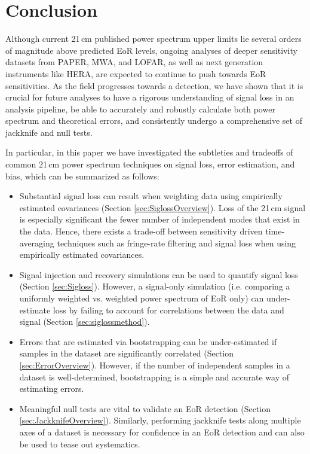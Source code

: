 \documentclass[preprint2,numberedappendix,tighten]{aastex6}  %
\begin{document}

\section{Conclusion}
\label{sec:Con}

Although current 21\,cm published power spectrum upper limits lie several orders of magnitude above predicted EoR levels, 
ongoing analyses of deeper sensitivity datasets from PAPER, MWA, and LOFAR, as well as next generation instruments like 
HERA, are expected to continue to push towards EoR sensitivities. As the field progresses towards a detection, we have shown 
that it is crucial for future analyses to have a rigorous understanding of signal loss in an analysis pipeline, be able to accurately 
and robustly calculate both power spectrum and theoretical errors, and consistently undergo a comprehensive set of jackknife 
and null tests.

In particular, in this paper we have investigated the subtleties and tradeoffs of common 21\,cm power spectrum techniques on 
signal loss, error estimation, and bias, which can be summarized as follows:

\begin{itemize}
\item Substantial signal loss can result when weighting data using empirically estimated covariances (Section 
\ref{sec:SiglossOverview}). Loss of the 21\,cm signal is especially significant the fewer number of independent modes that
exist in the data. Hence, there exists a trade-off between sensitivity driven 
time-averaging techniques such as fringe-rate filtering and signal loss when using empirically estimated covariances. 
\item Signal injection and recovery simulations can be used to quantify signal loss (Section \ref{sec:Sigloss}). However, a 
signal-only simulation (i.e. comparing a uniformly weighted vs. weighted power spectrum of EoR only) can under-estimate loss by 
failing to account for correlations between the data and signal (Section \ref{sec:siglossmethod}).
\item Errors that are estimated via bootstrapping can be under-estimated if samples in the dataset are significantly correlated 
(Section \ref{sec:ErrorOverview}). However, if the number of independent samples in a dataset is well-determined, bootstrapping is a 
simple and accurate way of estimating errors.
\item Meaningful null tests are vital to validate an EoR detection (Section \ref{sec:JackknifeOverview}). Similarly, performing 
jackknife tests along multiple axes of a dataset is necessary for confidence in an EoR detection and can also be used to tease 
out systematics.
\end{itemize}
\end{document}
